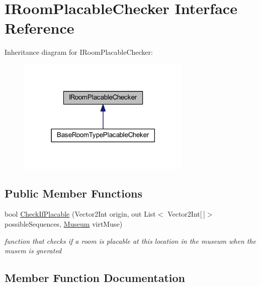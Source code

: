 \hypertarget{interface_i_room_placable_checker}{}\section{I\+Room\+Placable\+Checker Interface Reference}
\label{interface_i_room_placable_checker}


Inheritance diagram for I\+Room\+Placable\+Checker\+:
\nopagebreak
\begin{figure}[H]
\begin{center}
\leavevmode
\includegraphics[width=234pt]{interface_i_room_placable_checker__inherit__graph}
\end{center}
\end{figure}
\subsection*{Public Member Functions}
\begin{DoxyCompactItemize}
\item 
bool \mbox{\hyperlink{interface_i_room_placable_checker_ab4a1591854373fc3b48619dbeb1e2755}{Check\+If\+Placable}} (Vector2\+Int origin, out List$<$ Vector2\+Int\mbox{[}$\,$\mbox{]}$>$ possible\+Sequences, \mbox{\hyperlink{class_museum}{Museum}} virt\+Muse)
\begin{DoxyCompactList}\small\item\em function that checks if a room is placable at this location in the museum when the musem is gnerated \end{DoxyCompactList}\end{DoxyCompactItemize}


\subsection{Member Function Documentation}
\mbox{\label{interface_i_room_placable_checker_ab4a1591854373fc3b48619dbeb1e2755}} 
